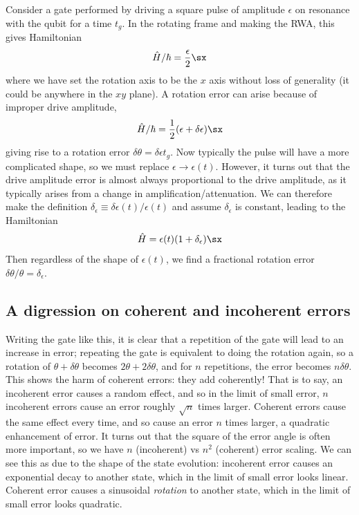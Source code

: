 Consider a gate performed by driving a square pulse of amplitude $\epsilon$ on resonance with the qubit for a time $t_g$. In the rotating frame and making the RWA, this gives Hamiltonian
\begin{equation*}
    \hat{H}/\hbar = \frac{\epsilon}{2} \sx
\end{equation*}
where we have set the rotation axis to be the $x$ axis without loss of generality (it could be anywhere in the $xy$ plane). A rotation error can arise because of improper drive amplitude,
\begin{equation}
    \hat{H}/\hbar =\frac{1}{2} (\epsilon + \delta\epsilon)\sx
\end{equation}
giving rise to a rotation error $\delta\theta=\delta\epsilon t_g$. Now typically the pulse will have a more complicated shape, so we must replace $\epsilon\rightarrow\epsilon (t)$. However, it turns out that the drive amplitude error is almost always proportional to the drive amplitude, as it typically arises from a change in amplification/attenuation. We can therefore make the definition $\delta_\epsilon \equiv \delta\epsilon(t)/\epsilon(t)$ and assume $\delta_\epsilon$ is constant, leading to the Hamiltonian
\begin{equation}
    \hat{H} = \epsilon(t)(1+\delta_\epsilon)\sx
\end{equation}
Then regardless of the shape of $\epsilon(t)$, we find a fractional rotation error $\delta\theta / \theta = \delta_\epsilon$.


\subsection{A digression on coherent and incoherent errors}
Writing the gate like this, it is clear that a repetition of the gate will lead to an increase in error; repeating the gate is equivalent to doing the rotation again, so a rotation of $\theta + \delta \theta$ becomes $2 \theta + 2\delta\theta$, and for $n$ repetitions, the error becomes $n \delta \theta$.
This shows the harm of coherent errors: they add coherently!
That is to say, an incoherent error causes a random effect, and so in the limit of small error, $n$ incoherent errors cause an error roughly $\sqrt{n}$ times larger.
Coherent errors cause the same effect every time, and so cause an error $n$ times larger, a quadratic enhancement of error.
It turns out that the square of the error angle is often more important, so we have $n$ (incoherent) vs $n^2$ (coherent) error scaling.
We can see this as due to the shape of the state evolution: incoherent error causes an exponential decay to another state, which in the limit of small error looks linear.
Coherent error causes a sinusoidal \textit{rotation} to another state, which in the limit of small error looks quadratic.

